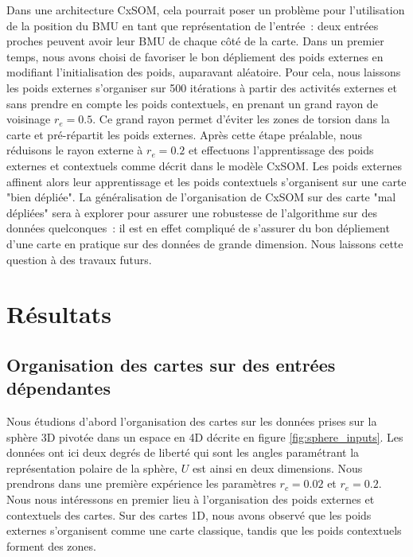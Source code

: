 \documentclass[../main]{subfiles}
\begin{document}
Dans une architecture CxSOM, cela pourrait poser un problème pour l'utilisation de la position du BMU en tant que représentation de l'entrée~: deux entrées proches peuvent avoir leur BMU de chaque côté de la carte.
Dans un premier temps, nous avons choisi de favoriser le bon dépliement des poids externes en modifiant l'initialisation des poids, auparavant aléatoire. Pour cela, nous laissons les poids externes s'organiser sur 500 itérations à partir des activités externes et sans prendre en compte les poids contextuels, en prenant un grand rayon de voisinage $r_e = 0.5$. 
Ce grand rayon permet d'éviter les zones de torsion dans la carte et pré-répartit les poids externes. Après cette étape préalable, nous réduisons le rayon externe  à $r_e = 0.2$ et effectuons l'apprentissage des poids externes et contextuels comme décrit dans le modèle CxSOM. Les poids externes affinent alors leur apprentissage et les poids contextuels s'organisent sur une carte "bien dépliée".
La généralisation de l'organisation de CxSOM sur des carte "mal dépliées" sera à explorer pour assurer une robustesse de l'algorithme sur des données quelconques~: il est en effet compliqué de s'assurer du bon dépliement d'une carte en pratique sur des données de grande dimension. Nous laissons cette question à des travaux futurs.

\section{Résultats}

\subsection{Organisation des cartes sur des entrées dépendantes}

Nous étudions d'abord l'organisation des cartes sur les données prises sur la sphère 3D pivotée dans un espace en 4D décrite en figure \ref{fig:sphere_inputs}. Les données ont ici deux degrés de liberté qui sont les angles paramétrant la représentation polaire de la sphère, $U$ est ainsi en deux dimensions. 
Nous prendrons dans une première expérience les paramètres $r_c = 0.02$ et $r_e = 0.2$.
Nous nous intéressons en premier lieu à l'organisation des poids externes et contextuels des cartes. Sur des cartes 1D, nous avons observé que les poids externes s'organisent comme une carte classique, tandis que les poids contextuels forment des zones.
\end{document}
